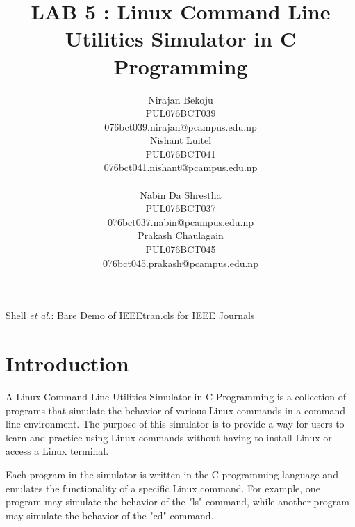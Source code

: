 \documentclass[journal,onecolumn]{IEEEtran}
\begin{document}
\title{LAB 5 : Linux Command Line Utilities Simulator in C Programming}

\author{
  \begin{multicols}{2}
    \centering
    Nirajan Bekoju\\
    PUL076BCT039\\
    076bct039.nirajan@pcampus.edu.np\\
    \columnbreak
    Nishant Luitel\\
    PUL076BCT041 \\
    076bct041.nishant@pcampus.edu.np \\
  \end{multicols}
  \begin{multicols}{2}
    \centering
    Nabin Da Shrestha\\
    PUL076BCT037 \\
    076bct037.nabin@pcampus.edu.np \\
    \columnbreak
    Prakash Chaulagain \\
    PUL076BCT045 \\
    076bct045.prakash@pcampus.edu.np
  \end{multicols}
}

%
{Shell \MakeLowercase{\textit{et al.}}: Bare Demo of IEEEtran.cls for IEEE Journals}

\maketitle

\IEEEpeerreviewmaketitle

\section{Introduction}
A Linux Command Line Utilities Simulator in C Programming is a collection of programs that simulate the behavior of various Linux commands in a command line environment. The purpose of this simulator is to provide a way for users to learn and practice using Linux commands without having to install Linux or access a Linux terminal.

Each program in the simulator is written in the C programming language and emulates the functionality of a specific Linux command. For example, one program may simulate the behavior of the "ls" command, while another program may simulate the behavior of the "cd" command.
\end{document}
